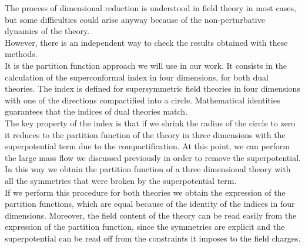 The process of dimensional reduction is understood in field theory in most cases, but some difficulties could arise anyway because of the non-perturbative dynamics of the theory.\\
However, there is an independent way to check the results obtained with these methods.\\
It is the partition function approach we will use in our work.
It consists in the calculation of the superconformal index in four dimensions, for both dual theories. 
The index is defined for supersymmetric field theories in four dimensions with one of the directions compactified into a circle.
Mathematical identities guarantees that the indices of dual theories match.\\
The key property of the index is that if we shrink the radius of the circle to zero it reduces to the partition function of the theory in three dimensions with the superpotential term due to the compactification.
At this point, we can perform the large mass flow we discussed previously in order to remove the superpotential. 
In this way we obtain the partition function of a three dimensional theory with all the symmetries that were broken by the superpotential term.\\
If we perform this procedure for both theories we obtain the expression of the partition functions, which are equal because of the identity of the indices in four dimensions.
Moreover, the field content of the theory can be read easily from the expression of the partition function, since the symmetries are explicit and the superpotential can be read off from the constraints it imposes to the field charges.\\  

